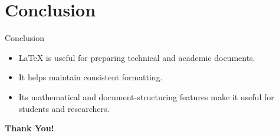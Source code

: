 \documentclass{beamer}
\begin{document}
	\section{Conclusion}
	
	\begin{frame}{Conclusion}
		
		\begin{itemize}
			\item LaTeX is useful for preparing technical
			and academic documents.
			
			\vspace{0.3cm}
			
			\item It helps maintain consistent formatting.
			
			\vspace{0.3cm}
			
			\item Its mathematical and document-structuring
			features make it useful for students and researchers.
		\end{itemize}
		
		\vspace{0.8cm}
		
		\begin{center}
			\Large\textbf{Thank You!}
		\end{center}
		
	\end{frame}
	
\end{document}
